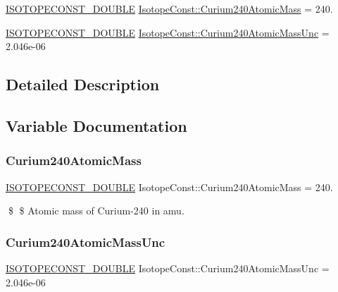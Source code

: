 \begin{DoxyCompactItemize}
\item 
\mbox{\hyperlink{group___isotope_const-_macros_ga8f45a7272ce02c0b4c65c44636ed719a}{I\+S\+O\+T\+O\+P\+E\+C\+O\+N\+S\+T\+\_\+\+D\+O\+U\+B\+LE}} \mbox{\hyperlink{group___isotope_const-_curium-_cm240_gab8ca4201838471c35fe616503c9c35e0}{Isotope\+Const\+::\+Curium240\+Atomic\+Mass}} = 240.
\item 
\mbox{\hyperlink{group___isotope_const-_macros_ga8f45a7272ce02c0b4c65c44636ed719a}{I\+S\+O\+T\+O\+P\+E\+C\+O\+N\+S\+T\+\_\+\+D\+O\+U\+B\+LE}} \mbox{\hyperlink{group___isotope_const-_curium-_cm240_gad715ee96a4925cc43835240b1f141b88}{Isotope\+Const\+::\+Curium240\+Atomic\+Mass\+Unc}} = 2.\+046e-\/06
\end{DoxyCompactItemize}


\subsection{Detailed Description}


\subsection{Variable Documentation}
\mbox{\label{group___isotope_const-_curium-_cm240_gab8ca4201838471c35fe616503c9c35e0}} 
\subsubsection{\texorpdfstring{Curium240\+Atomic\+Mass}{Curium240AtomicMass}}
{\footnotesize\ttfamily \mbox{\hyperlink{group___isotope_const-_macros_ga8f45a7272ce02c0b4c65c44636ed719a}{I\+S\+O\+T\+O\+P\+E\+C\+O\+N\+S\+T\+\_\+\+D\+O\+U\+B\+LE}} Isotope\+Const\+::\+Curium240\+Atomic\+Mass = 240.}

\$ \$ Atomic mass of Curium-\/240 in amu. \mbox{\label{group___isotope_const-_curium-_cm240_gad715ee96a4925cc43835240b1f141b88}} 
\subsubsection{\texorpdfstring{Curium240\+Atomic\+Mass\+Unc}{Curium240AtomicMassUnc}}
{\footnotesize\ttfamily \mbox{\hyperlink{group___isotope_const-_macros_ga8f45a7272ce02c0b4c65c44636ed719a}{I\+S\+O\+T\+O\+P\+E\+C\+O\+N\+S\+T\+\_\+\+D\+O\+U\+B\+LE}} Isotope\+Const\+::\+Curium240\+Atomic\+Mass\+Unc = 2.\+046e-\/06}

